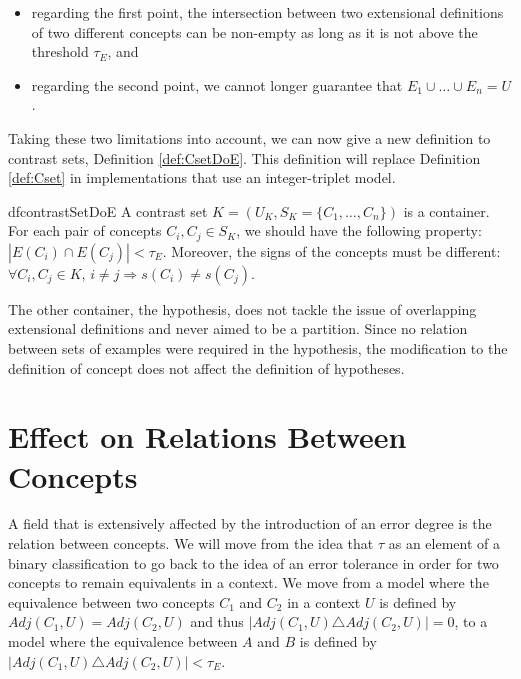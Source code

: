 \begin{itemize}
    \item regarding the first point, the intersection between two extensional definitions of two different concepts can be non-empty as long as it is not above the threshold $\tau_{E}$, and
    \item regarding the second point, we cannot longer guarantee that $E_{1} \cup \ldots \cup E_{n} = U$.
\end{itemize}

Taking these two limitations into account, we can now give a new definition to contrast sets, Definition \ref{def:CsetDoE}. This definition will replace Definition \ref{def:Cset} in implementations that use an integer-triplet model.

\begin{restatable}{df}{contrastSetDoE}
\label{def:CsetDoE}
A contrast set $K = (U_{K}, S_{K} = \{ C_{1}, \ldots ,C_{n} \})$ is a container. For each pair of concepts $C_{i}, C_{j} \in S_{K}$, we should have the following property: $|E(C_{i}) \cap E(C_{j})| < \tau_{E}$. Moreover, the signs of the concepts must be different: $\forall C_{i},C_{j} \in K$, $i \neq j \Rightarrow s(C_{i}) \neq s(C_{j})$.
\end{restatable}

The other container, the hypothesis, does not tackle the issue of overlapping extensional definitions and never aimed to be a partition. Since no relation between sets of examples were required in the hypothesis, the modification to the definition of concept does not affect the definition of hypotheses.

\section{Effect on Relations Between Concepts}
\label{sec:DoGEffectRelation}

A field that is extensively affected by the introduction of an error degree is the relation between concepts. We will move from the idea that $\tau$ as an element of a binary classification to go back to the idea of an error tolerance in order for two concepts to remain equivalents in a context. We move from a model where the equivalence between two concepts $C_{1}$ and $C_{2}$ in a context $U$ is defined by $Adj(C_{1}, U) = Adj(C_{2}, U)$ and thus $| Adj(C_{1}, U) \triangle Adj(C_{2}, U)| = 0$, to a model where the equivalence between $A$ and $B$ is defined by $|Adj(C_{1}, U) \triangle Adj(C_{2}, U)| < \tau_{E}$.

